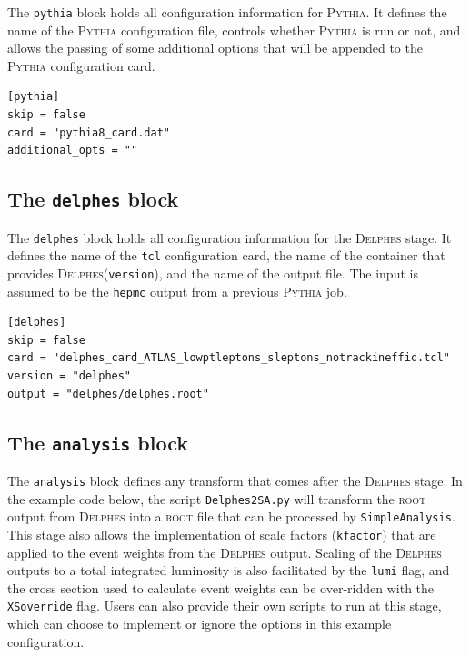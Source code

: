 \documentclass{article}
\newcommand{\simpleanalysis}{\texttt{SimpleAnalysis}}
\newcommand{\pythia}{\textsc{Pythia}}
\newcommand{\delphes}{\textsc{Delphes}}
\newcommand{\ROOT}{\textsc{root}}
\newcommand{\toml}{\textsc{toml}}
\begin{document}
The \texttt{pythia} block holds all configuration information for \pythia.  It defines the name of the \pythia{} configuration file, controls whether \pythia{} is run or not, and allows the passing of some additional options that will be appended to the \pythia{} configuration card.

\begin{listing}[H]
	\begin{verbatim}
[pythia]
skip = false
card = "pythia8_card.dat"
additional_opts = ""
        \end{verbatim}
	\caption{The \texttt{pythia} block of an example \toml{} configuration file for generating slepton events.}
	\label{slepton-config-pythia}
\end{listing}

\subsection{The \texttt{delphes} block}
\label{ssec:the-delphes-block}

The \texttt{delphes} block holds all configuration information for the \delphes{} stage.  It defines the name of the \texttt{tcl} configuration card, the name of the container that provides \delphes (\texttt{version}), and the name of the output file.  The input is assumed to be the \texttt{hepmc} output from a previous \pythia{} job.

\begin{listing}[H]
	\begin{verbatim}
[delphes]
skip = false
card = "delphes_card_ATLAS_lowptleptons_sleptons_notrackineffic.tcl"
version = "delphes"
output = "delphes/delphes.root"
        \end{verbatim}
	\caption{The \texttt{delphes} block of an example \toml{} configuration file for generating slepton events.}
	\label{slepton-config-delphes}
\end{listing}

\subsection{The \texttt{analysis} block}
\label{ssec:the-analysis-block}

The \texttt{analysis} block defines any transform that comes after the \delphes{} stage.  In the example code below, the script \texttt{Delphes2SA.py} will transform the \ROOT{} output from \delphes{} into a \ROOT{} file that can be processed by \simpleanalysis.  This stage also allows the implementation of scale factors (\texttt{kfactor}) that are applied to the event weights from the \delphes{} output.  Scaling of the \delphes{} outputs to a total integrated luminosity is also facilitated by the \texttt{lumi} flag, and the cross section used to calculate event weights can be over-ridden with the \texttt{XSoverride} flag.  Users can also provide their own scripts to run at this stage, which can choose to implement or ignore the options in this example configuration.
\end{document}
